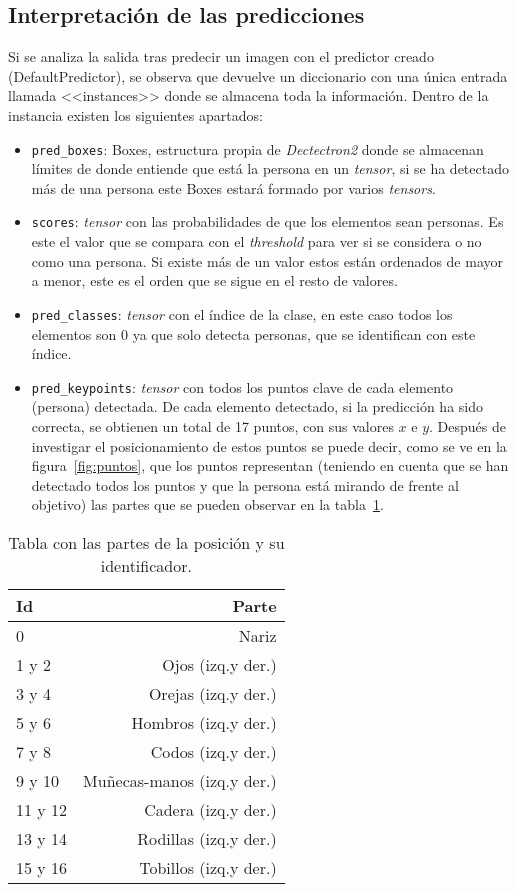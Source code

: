{\subsection{Interpretación de las predicciones}
Si se analiza la salida tras predecir un imagen con el predictor creado (DefaultPredictor), se observa que devuelve un diccionario con una única entrada llamada <<instances>> donde se almacena toda la información. Dentro de la instancia existen los siguientes apartados:
\begin{itemize}
	\item \texttt{pred\_boxes}: Boxes, estructura propia de \textit{Dectectron2} donde se almacenan límites de donde entiende que está la persona en un \textit{tensor}, si se ha detectado más de una persona este Boxes estará formado por varios \textit{tensors}.
	\item \texttt{scores}: \textit{tensor} con las probabilidades de que los elementos sean personas. Es este el valor que se compara con el \textit{threshold} para ver si se considera o no como una persona. Si existe más de un valor estos están ordenados de mayor a menor, este es el orden que se sigue en el resto de valores.
	\item \texttt{pred\_classes}: \textit{tensor} con el índice de la clase, en este caso todos los elementos son 0 ya que solo detecta personas, que se identifican con este índice.
	\item \texttt{pred\_keypoints}: \textit{tensor} con todos los puntos clave de cada elemento (persona) detectada. De cada elemento detectado, si la predicción ha sido correcta, se obtienen un total de 17 puntos, con sus valores $x$ e $y$. Después de investigar el posicionamiento de estos puntos se puede decir, como se ve en la figura~\ref{fig:puntos}, que los puntos representan (teniendo en cuenta que se han detectado todos los puntos y que la persona está mirando de frente al objetivo) las partes que se pueden observar en la tabla~\ref{tab:partes}.
\end{itemize}

\begin{table}[h]
	\centering
	\begin{tabular}{lr}
		\toprule
		\textbf{Id} & \textbf{Parte}\\
		\midrule
		0&Nariz\\
		1 y 2&Ojos (izq.y der.)\\
		3 y 4&Orejas (izq.y der.)\\
		5 y 6&Hombros (izq.y der.)\\
		7 y 8&Codos (izq.y der.)\\
		9 y 10&Muñecas-manos (izq.y der.)\\
		11 y 12&Cadera (izq.y der.)\\
		13 y 14&Rodillas (izq.y der.)\\
		15 y 16&Tobillos (izq.y der.)\\
	\bottomrule
	\end{tabular}
\caption{Tabla con las partes de la posición y su identificador.}
\label{tab:partes}
\end{table}


}
